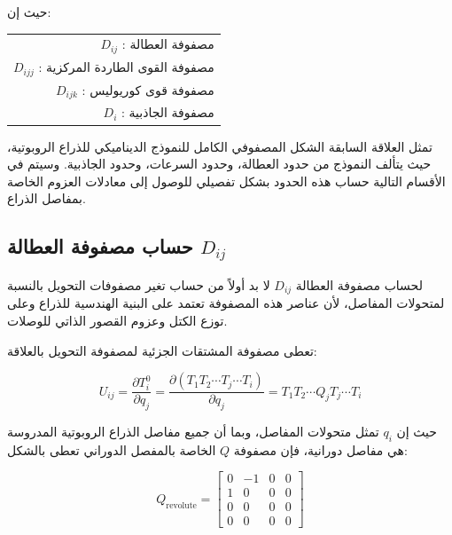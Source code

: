 حيث إن:

\begin{flushright}
\large
\begin{tabular}{@{}r@{}}
$D_{ij}$ : مصفوفة العطالة \\[0.1cm]

$D_{ijj}$ : مصفوفة القوى الطاردة المركزية \\[0.1cm]

$D_{ijk}$ : مصفوفة قوى كوريوليس \\[0.1cm]

$D_i$ : مصفوفة الجاذبية
\end{tabular}
\end{flushright}

تمثل العلاقة السابقة الشكل المصفوفي الكامل للنموذج الديناميكي للذراع الروبوتية، حيث يتألف النموذج من حدود العطالة، وحدود السرعات، وحدود الجاذبية. وسيتم في الأقسام التالية حساب هذه الحدود بشكل تفصيلي للوصول إلى معادلات العزوم الخاصة بمفاصل الذراع.










\subsection{حساب مصفوفة العطالة $D_{ij}$}

لحساب مصفوفة العطالة $D_{ij}$ لا بد أولاً من حساب تغير مصفوفات التحويل بالنسبة لمتحولات المفاصل، لأن عناصر هذه المصفوفة تعتمد على البنية الهندسية للذراع وعلى توزع الكتل وعزوم القصور الذاتي للوصلات.

تعطى مصفوفة المشتقات الجزئية لمصفوفة التحويل بالعلاقة:

\begin{equation}
U_{ij}
=
\frac{\partial T_i^0}{\partial q_j}
=
\frac{\partial \left(T_1 T_2 \cdots T_j \cdots T_i\right)}
{\partial q_j}
=
T_1 T_2 \cdots Q_j T_j \cdots T_i
\end{equation}

حيث إن $q_i$ تمثل متحولات المفاصل، وبما أن جميع مفاصل الذراع الروبوتية المدروسة هي مفاصل دورانية، فإن مصفوفة $Q$ الخاصة بالمفصل الدوراني تعطى بالشكل:

\begin{equation}
Q_{\text{revolute}} =
\begin{bmatrix}
0 & -1 & 0 & 0 \\
1 & 0  & 0 & 0 \\
0 & 0  & 0 & 0 \\
0 & 0  & 0 & 0
\end{bmatrix}
\end{equation}

